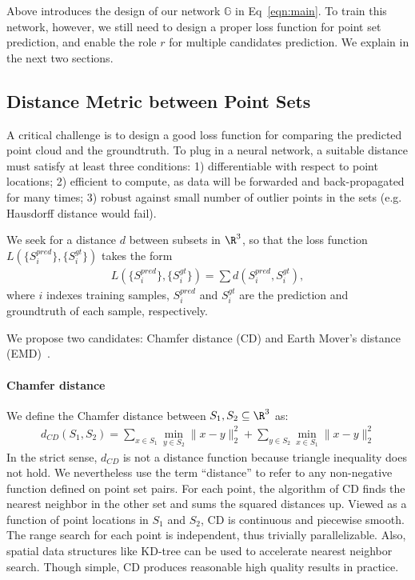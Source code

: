 \documentclass[10pt,twocolumn,letterpaper]{article}
\begin{document}
Above introduces the design of our network $\mathbb{G}$ in Eq~\ref{eqn:main}. To train this network, however, we still need to design a proper loss function for point set prediction, and enable the role $r$ for multiple candidates prediction. We explain in the next two sections.
\subsection{Distance Metric between Point Sets}\label{sec:method:loss}
A critical challenge is to design a good loss function for comparing the predicted point cloud and the groundtruth. To plug in a neural network, a suitable distance must satisfy at least three conditions: 1) differentiable with respect to point locations; 2) efficient to compute, as data will be forwarded and back-propagated for many times; 3) robust against small number of outlier points in the sets (e.g. Hausdorff distance would fail).

We seek for a distance $d$ between subsets in $\R^3$, so that the loss function $L(\{S^{pred}_i\}, \{S^{gt}_i\})$ takes the form
\begin{align}
    L(\{S^{pred}_i\}, \{S^{gt}_i\}) = \sum d(S^{pred}_i, S^{gt}_i),
    \label{eqn:loss}
\end{align}
where $i$ indexes training samples, $S_i^{pred}$ and $S_i^{gt}$ are the prediction and groundtruth of each sample, respectively.

We propose two candidates: Chamfer distance (CD) and Earth Mover's distance (EMD)~\cite{rubner2000earth}.

\paragraph{Chamfer distance} We define the Chamfer distance between $S_1, S_2\subseteq \R^3$ as:
\begin{align*}
d_{CD}(S_1, S_2)=\sum_{x\in S_1}\min_{y\in S_2} \|x-y\|^2_2+\sum_{y\in S_2}\min_{x\in S_1} \|x-y\|^2_2
\end{align*}
In the strict sense, $d_{CD}$ is not a distance function because triangle inequality does not hold. We nevertheless use the term ``distance'' to refer to any non-negative function defined on point set pairs. For each point, the algorithm of CD finds the nearest neighbor in the other set and sums the squared distances up.   Viewed as a function of point locations in $S_1$ and $S_2$, $\mbox{CD}$ is continuous and piecewise smooth. The range search for each point is independent, thus trivially parallelizable. Also, spatial data structures like KD-tree can be used to accelerate nearest neighbor search. Though simple, CD produces reasonable high quality results in practice.
\end{document}
